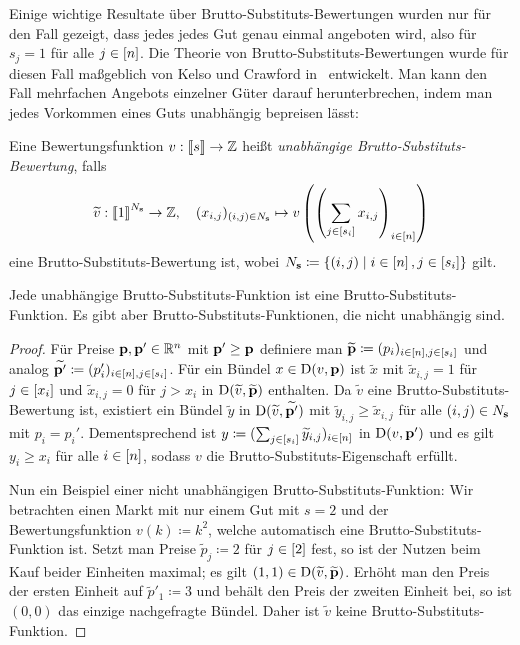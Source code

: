 Einige wichtige Resultate über Brutto-Substituts-Bewertungen wurden nur für den Fall gezeigt, dass jedes jedes Gut genau einmal angeboten wird, also für $s_j = 1$ für alle $j\in\left[ n \right]$.
Die Theorie von Brutto-Substituts-Bewertungen wurde für diesen Fall maßgeblich von Kelso und Crawford in~\cite{KelsoCrawford} entwickelt.
Man kann den Fall mehrfachen Angebots einzelner Güter darauf herunterbrechen, indem man jedes Vorkommen eines Guts unabhängig bepreisen lässt:
\newcommand{\tild}[1]{\widetilde{#1}}
\begin{definition}
	Eine Bewertungsfunktion $v: \left\llbracket s \right\rrbracket \rightarrow \mathbb{Z}$ heißt \emph{unabhängige Brutto-Substituts-Bewertung}, falls \[
	\tild{v}: \ffirst{1}^{N_\fs} \rightarrow \Z,
	\quad (x_{i,j})_{(i,j)\in N_\fs} \mapsto v\left( \left( \sum_{j\in\first{s_i}} x_{i,j} \right)_{i\in\first{n}} \right)
	\]
	eine Brutto-Substituts-Bewertung ist, wobei $N_{\mathbf{s}} \coloneqq \{ (i,j) \mid i\in\left[ n \right], j\in\left[ s_i \right] \}$ gilt.
\end{definition}
\begin{proposition}
	Jede unabhängige Brutto-Substituts-Funktion ist eine Brutto-Substituts-Funktion.
	Es gibt aber Brutto-Substituts-Funktionen, die nicht unabhängig sind.
\end{proposition}
\begin{proof}
	Für Preise $\mathbf{p},\mathbf{p}'\in\mathbb{R}^n$ mit $\mathbf{p}' \geq \mathbf{p}$ definiere man $\tild{\fp}\coloneqq (p_i)_{i\in\first{n},j\in\first{s_i}}$ und analog $\tild{\fp'}\coloneqq (p_i')_{i\in\first{n},j\in\first{s_i}}$.
	Für ein Bündel $x\in\operatorname{D}(v,\mathbf{p})$ ist $\tild{x}$ mit $\tild{x}_{i,j} = 1$ für $j\in\left[ x_i \right]$ und $\tild{x}_{i,j}= 0$ für $j > x_i$ in $\NB(\tild{v}, \tild{\fp})$ enthalten.
	Da $\tild{v}$ eine Brutto-Substituts-Bewertung ist, existiert ein Bündel $\tild{y}$ in $\NB(\tild{v}, \tild{\fp'})$ mit $\tild{y}_{i,j} \geq \tild{x}_{i,j}$ für alle $(i,j)\in N_{\mathbf{s}}$ mit $p_i = p_i'$.
	Dementsprechend ist $y\coloneqq(\sum_{j\in\first{s_i}} \tild{y}_{i,j})_{i\in\first{n}}$ in $\operatorname{D}(v, \mathbf{p}')$ und es gilt $y_i \geq x_i$ für alle $i\in\left[ n \right]$, sodass $v$ die Brutto-Substituts-Eigenschaft erfüllt.
	
	Nun ein Beispiel einer nicht unabhängigen Brutto-Substituts-Funktion: Wir betrachten einen Markt mit nur einem Gut mit $s=2$ und der Bewertungsfunktion $v(k)\coloneqq k^2$, welche automatisch eine Brutto-Substituts-Funktion ist.
	Setzt man Preise $\tild{p}_j \coloneqq 2$ für $j\in\left[ 2 \right]$ fest,
	so ist der Nutzen beim Kauf beider Einheiten maximal; es gilt $(1,1)\in \NB(\tild{v}, \tild{\fp})$.
	Erhöht man den Preis der ersten Einheit auf $\tild{p}'_1 \coloneqq 3$ und behält den Preis der zweiten Einheit bei, so ist $(0,0)$ das einzige nachgefragte Bündel.
	Daher ist $\tild{v}$ keine Brutto-Substituts-Funktion.
\end{proof}

